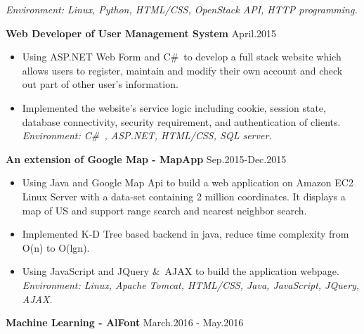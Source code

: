 \documentclass{resume} %
\begin{document}
\begin{spacing}{1}
\begin{center}
\begin{itemize}
\hspace{-9mm}\textit{Environment: Linux, Python,  HTML/CSS, OpenStack API, HTTP programming.}
\vspace{-1mm}
\end{itemize}
\vspace{-1mm}
{\bf Web Developer of User Management System} \hfill {\small  April.2015} \\
\vspace{-0mm}
\begin{itemize}
\item{Using ASP.NET Web Form and C\#\ to develop a full stack website which allows users to register, maintain and modify their own account and check out part of other user’s information.} \\
\item{Implemented the website's service logic including cookie, session state, database connectivity, security requirement, and authentication of clients.} \\
\hspace{-9mm}\textit{Environment: C\#\ , ASP.NET, HTML/CSS, SQL server.}
\vspace{-1mm}
\end{itemize}
\vspace{-1mm}
{\bf An extension of Google Map - MapApp} \hfill {\small  Sep.2015-Dec.2015} \\
\vspace{-0mm}
\begin{itemize}
\item{Using Java and Google Map Api to build a web application on Amazon EC2 Linux Server with a data-set containing 2 million coordinates. It displays a map of US and support range search and nearest neighbor search.} \\
\item{Implemented K-D Tree based backend in java, reduce time complexity from O(n) to O(lgn).  } \\
\item{Using JavaScript and JQuery \&\ AJAX to build the application webpage.} \\
\hspace{-9mm}\textit{Environment: Linux, Apache Tomcat, HTML/CSS, Java, JavaScript, JQuery, AJAX.}
\vspace{-2mm}
\end{itemize}
{\bf Machine Learning - AlFont} \hfill {\small March.2016 - May.2016} \\
\vspace{-0mm}
\begin{itemize}

\end{itemize}
\end{center}
\end{spacing}
\end{document}
